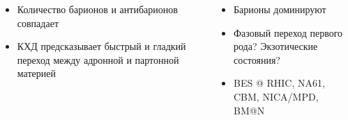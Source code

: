 \documentclass[dvipsnames] {beamer}
\begin{document}
\begin{frame}
\begin{columns}[t]
    \begin{columns}[t]
      \begin{block}{\bf {}}
        {\tiny
          \begin{itemize}
          \item Количество барионов и антибарионов совпадает
          \item КХД предсказывает быстрый и гладкий переход между адронной и партонной материей
          \end{itemize}
        }
      \end{block}
      \begin{block}{\bf {}}
        {\tiny
          \begin{itemize}
          \item Барионы доминируют
          \item {\color {red} Фазовый переход первого рода? Экзотические состояния?}
          \item BES @ RHIC, NA61, CBM, {\color{red} NICA/MPD, BM@N}
          \end{itemize}
        }
      \end{block}
    \end{columns}


\end{columns}
\end{frame}
\end{document}
